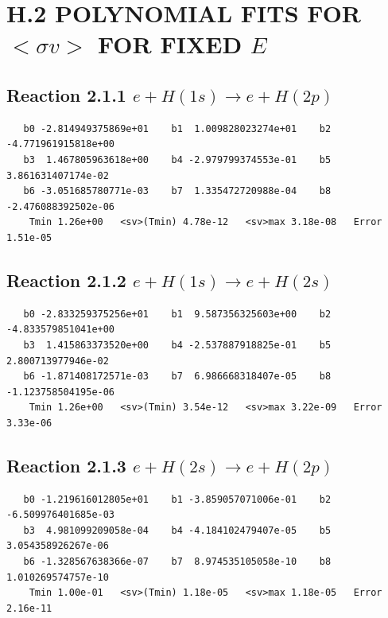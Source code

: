 \documentclass[12pt,dvipdfmx]{article}
\begin{document}
\newpage
\section{H.2  POLYNOMIAL FITS FOR $<\sigma v>$ FOR FIXED $E$}


\subsection{
Reaction 2.1.1 $   e + H(1s) \rightarrow e + H(2p)$}


\begin{small}\begin{verbatim}
   b0 -2.814949375869e+01    b1  1.009828023274e+01    b2 -4.771961915818e+00
   b3  1.467805963618e+00    b4 -2.979799374553e-01    b5  3.861631407174e-02
   b6 -3.051685780771e-03    b7  1.335472720988e-04    b8 -2.476088392502e-06
    Tmin 1.26e+00   <sv>(Tmin) 4.78e-12   <sv>max 3.18e-08   Error 1.51e-05
\end{verbatim}\end{small}

\newpage
\subsection{
Reaction 2.1.2 $   e + H(1s) \rightarrow e + H(2s)$}


\begin{small}\begin{verbatim}
   b0 -2.833259375256e+01    b1  9.587356325603e+00    b2 -4.833579851041e+00
   b3  1.415863373520e+00    b4 -2.537887918825e-01    b5  2.800713977946e-02
   b6 -1.871408172571e-03    b7  6.986668318407e-05    b8 -1.123758504195e-06
    Tmin 1.26e+00   <sv>(Tmin) 3.54e-12   <sv>max 3.22e-09   Error 3.33e-06
\end{verbatim}\end{small}

\newpage
\subsection{
Reaction 2.1.3 $   e + H(2s) \rightarrow e + H(2p)$}


\begin{small}\begin{verbatim}
   b0 -1.219616012805e+01    b1 -3.859057071006e-01    b2 -6.509976401685e-03
   b3  4.981099209058e-04    b4 -4.184102479407e-05    b5  3.054358926267e-06
   b6 -1.328567638366e-07    b7  8.974535105058e-10    b8  1.010269574757e-10
    Tmin 1.00e-01   <sv>(Tmin) 1.18e-05   <sv>max 1.18e-05   Error 2.16e-11
\end{verbatim}\end{small}
\end{document}
